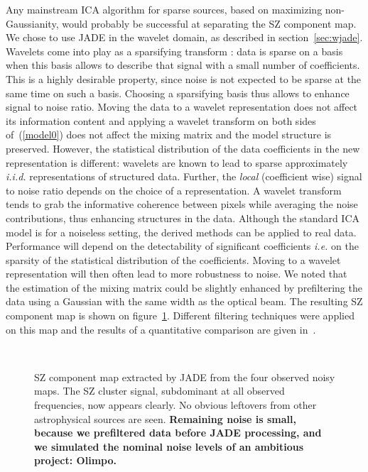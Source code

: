 Any mainstream ICA algorithm for sparse sources, based on maximizing non-Gaussianity, would probably be successful at separating the SZ component map. 
We chose to use JADE in the wavelet domain, as described in section~\ref{sec:wjade}. Wavelets come into play as a sparsifying transform : data is sparse 
on a basis when this basis allows to describe that signal with a small number of coefficients. This is a highly desirable property, since noise is not 
expected to be sparse at the same time on such a basis. Choosing a sparsifying basis thus allows to enhance signal to noise ratio. Moving the data to 
a wavelet representation does not affect its information content and applying a wavelet transform on both sides of~(\ref{model0}) does not affect the 
mixing matrix and the model structure is preserved. However, the statistical distribution of the data coefficients in the new representation is different: 
wavelets are known to lead to sparse approximately \emph{i.i.d.} representations of structured data. Further, the \emph{local} (coefficient wise) signal 
to noise ratio depends on the choice of a representation. A wavelet transform tends to grab the informative coherence between pixels while averaging 
the noise contributions, thus enhancing structures in the data. Although the standard ICA model is for a noiseless setting, the derived methods can be 
applied to real data. Performance will depend on the detectability of significant coefficients \emph{i.e.} on the sparsity of the statistical distribution 
of the coefficients. Moving to a wavelet representation will then often lead to more robustness to noise. We noted that the estimation of the mixing matrix 
could be slightly enhanced by prefiltering the data using a Gaussian with the same width as the optical beam. The resulting SZ component map is shown 
on figure~\ref{JADEMaps}. Different filtering techniques were applied on this map and the results of a quantitative comparison are given in~\cite{cluster:sz_cluster}.




\begin{figure}[htp]
 \centerline{
\hbox{
}
}
\caption{SZ component map extracted by JADE from the four observed noisy maps. The SZ cluster signal, subdominant at all observed frequencies, 
now appears clearly. No obvious leftovers from other astrophysical sources are seen. \textbf{Remaining noise is small, because we prefiltered 
data before JADE processing, and we simulated the nominal noise levels of an ambitious project: Olimpo.}}
\label{JADEMaps}
\end{figure}


 
